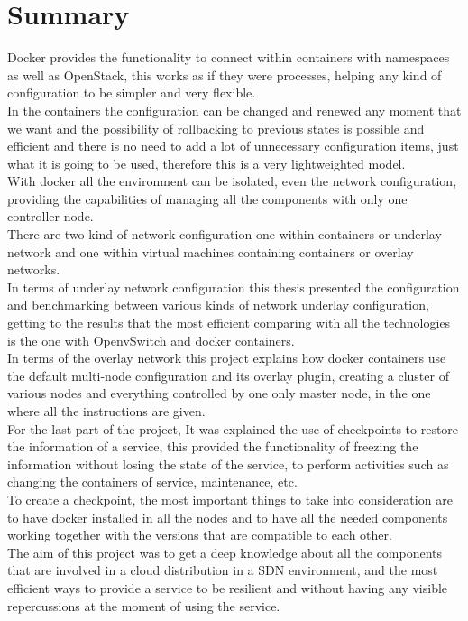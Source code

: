 \begingroup
\chapter{Summary}

Docker provides the functionality to connect within containers with namespaces as well as OpenStack, this works as if they were processes, helping any kind of configuration to be simpler and very flexible. \\

In the containers the configuration can be changed and renewed any moment that we want and the possibility of rollbacking to previous states is possible and efficient and there is no need to add a lot of unnecessary configuration items, just what it is going to be used, therefore this is a very lightweighted model.\\

With docker all the environment can be isolated, even the network configuration, providing the capabilities of managing all the components with only one controller node.\\

There are two kind of network configuration one within containers or underlay network and one within virtual machines containing containers or overlay networks.\\

In terms of underlay network configuration this thesis presented the configuration and benchmarking between various kinds of network underlay configuration, getting to the results that the most efficient comparing with all the technologies is the one with OpenvSwitch and docker containers.\\

In terms of the overlay network this project explains how docker containers use the default multi-node configuration and its overlay plugin, creating a cluster of various nodes and everything controlled by one only master node, in the one where all the instructions are given.\\

For the last part of the project, It was explained the use of checkpoints to restore the information of a service, this provided the functionality of freezing the information without losing the state of the service, to perform activities such as changing the containers of service, maintenance, etc.\\

To create a checkpoint, the most important things to take into consideration are to have docker installed in all the nodes and to have all the needed components working together with the versions that are compatible to each other.\\

The aim of this project was to get a deep knowledge about all the components that are involved in a cloud distribution in a SDN environment, and the most efficient ways to provide a service to be resilient and without having any visible repercussions at the moment of using the service.

\endgroup

